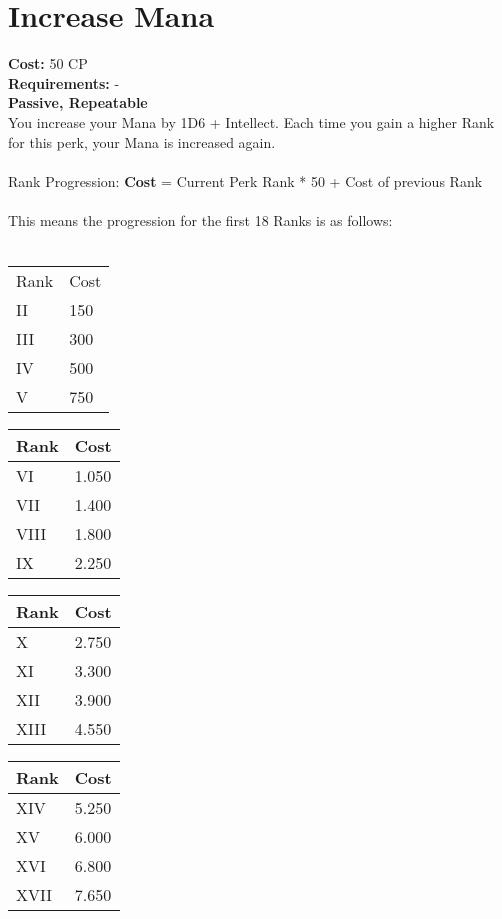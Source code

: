 \section{Increase Mana}\label{perk:increasemana}
\textbf{Cost:} 50 CP\\
\textbf{Requirements:} -\\
\textbf{Passive, Repeatable}\\
You increase your Mana by 1D6 + Intellect.
Each time you gain a higher Rank for this perk, your Mana is increased again.\\
\\
Rank Progression: \textbf{Cost} = Current Perk Rank * 50 + Cost of previous Rank\\
\\
This means the progression for the first 18 Ranks is as follows:\\
\\
\begin{minipage}{0.25\textwidth}
    \begin{tabular}{l | l}
        Rank & Cost\\
        II & 150\\
        III & 300\\
        IV & 500\\
        V & 750\\
    \end{tabular}
\end{minipage}
\begin{minipage}{0.25\textwidth}
    \begin{tabular}{l | l}
        Rank & Cost\\ \hline
        VI & 1.050\\
        VII & 1.400\\
        VIII & 1.800\\
        IX & 2.250\\
    \end{tabular}
\end{minipage}
\begin{minipage}{0.25\textwidth}
    \begin{tabular}{l | l}
        Rank & Cost\\ \hline
        X & 2.750\\
        XI & 3.300\\
        XII & 3.900\\
        XIII & 4.550\\
    \end{tabular}
\end{minipage}
\begin{minipage}{0.25\textwidth}
    \begin{tabular}{l | l}
        Rank & Cost\\ \hline
        XIV & 5.250\\
        XV & 6.000\\
        XVI & 6.800\\
        XVII & 7.650\\
    \end{tabular}
\end{minipage}